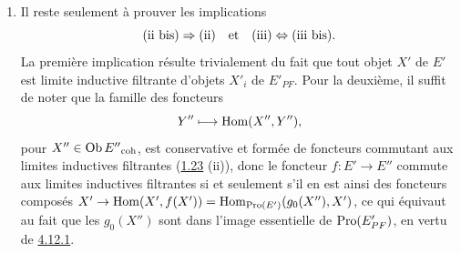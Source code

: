 \documentclass[10pt]{../fichiers-configuration-latex/smfart}
\begin{document}
\begin{enumerate}
Comme une limite inductive filtrante de foncteurs commutant aux
limites inductives filtrantes possède la même propriété, la suffisance
résulte de la définition de $E'_{PF}$. Pour la nécessité, il faut
prouver que si le foncteur $h$ commute aux limites inductives
filtrantes, alors dans la catégorie filtrante $E'_{/h}$ des couples
$(X', u)$ avec $u \in h(X')$, la sous-catégorie formée des couples
$(X', u)$ avec $X'\in \Ob E'_{PF}$ est cofinale, \ie que pour tout
$(X', u)$ dans $E'_{/h}$, il existe un morphisme $X'_{0} \to
X'$, avec $X'_{0} \in \Ob E'_{PF}$, tel que $u \in \text{Im}
(h(X'_0) \to h(X'))$.\pageoriginale Or on sait que $X'$ est limite inductive
filtrante d'objets $X'_i$ de $E'_{PF}$ (\hyperref[VI.cor1.24.2]{1.24.2} a)), donc $h(X')$
est limite inductive filtrante des $h(X'_i)$, d'où la conclusion.

\item Il reste seulement à prouver les implications
$$
\text{(ii bis)} \Rightarrow \text{(ii)\quad et\quad  (iii)} \Leftrightarrow \text{(iii bis)}{}.
$$
La première implication résulte trivialement du fait que tout objet
$X'$ de $E'$ est limite inductive filtrante d'objets $X'_i$ de
$E'_{PF}$. Pour la deuxième, il suffit de noter que la famille des
foncteurs
$$
Y'' \longmapsto \operatorname{Hom}(X'', Y''){},
$$
pour $X'' \in \operatorname{Ob} {E''}_{\mathrm{coh}}$, est conservative et formée de
foncteurs commutant aux limites inductives filtrantes (\hyperref[VI.thm1.23]{1.23} (ii)),
donc le foncteur $f : E'\to E''$ commute aux limites inductives
filtrantes si et seulement s'il en est ainsi des foncteurs composés
$X'\to \Hom(X', f(X')) = \Hom_{\Pro(E')}(g_0 (X''), X')$, ce qui
équivaut au fait que les $g_0(X'')$ sont dans l'image essentielle
de $\operatorname{Pro}(E'_{PF})$, en vertu de \hyperref[VI.lem4.12.1]{4.12.1}. \cqfd
\end{enumerate}
\end{document}
